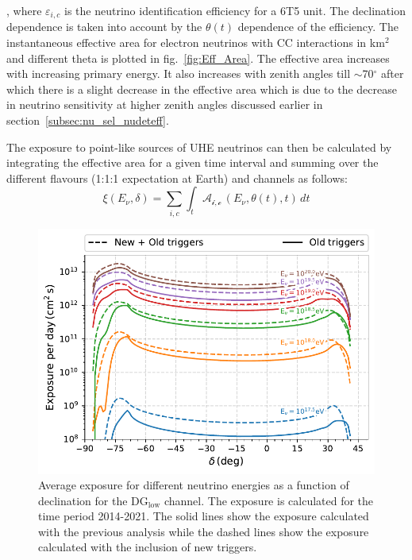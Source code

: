 , where $\varepsilon_{i,c}$ is the neutrino identification efficiency for a 6T5 unit. The declination dependence is taken into account by the $\theta(t)$ dependence of the efficiency. The instantaneous effective area for electron neutrinos with CC interactions in km$^2$ and different theta is plotted in fig.~\ref{fig:Eff_Area}. The effective area increases with increasing primary energy. It also increases with zenith angles till $\sim$70$^\circ$ after which there is a slight decrease in the effective area which is due to the decrease in neutrino sensitivity at higher zenith angles discussed earlier in section~\ref{subsec:nu_sel_nudeteff}. 

The exposure to point-like sources of UHE neutrinos can then be calculated by integrating the effective area for a given time interval and summing over the different flavours (1:1:1 expectation at Earth) and channels as follows:
\begin{equation}
  \label{eq:exposure_point}
  \xi(E_{\nu}, \delta) = \sum_{i,c} \int_{t} \mathcal{A_{i,c}} \, (E_{\nu},\theta(t),t) \, dt
\end{equation}


\begin{figure}[t!]
  \centering
  \includegraphics[width=\textwidth]{thesis_figures/PointLimits/Exposure_vs_Dec.pdf}
  \caption{Average exposure for different neutrino energies as a function of declination for the DG$\mathrm{_{\text{low}}}$ channel. The exposure is calculated for the time period 2014-2021. The solid lines show the exposure calculated with the previous analysis while the dashed lines show the exposure calculated with the inclusion of new triggers.}
  \label{fig:Exp_dec}
\end{figure}

